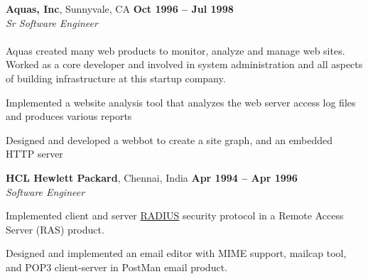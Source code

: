 \documentclass[margin,line]{resume}
\begin{document}
\begin{resume}
    \textbf{Aquas, Inc}, Sunnyvale, CA \hfill \textbf{Oct 1996 -- Jul 1998}\\ 
    \textsl{Sr Software Engineer}\\\\ 
Aquas created many web products to monitor, analyze and manage web sites. Worked as a core developer and involved in system administration and all aspects of building infrastructure at this startup company.
    \begin{list2}
    \item Implemented a website analysis tool that analyzes the web server access log files and produces various reports
    \item Designed and developed a webbot to create a site graph, and an embedded HTTP server
    \end{list2}\vspace{-1.5mm}


    \textbf{HCL Hewlett Packard}, Chennai, India \hfill \textbf{Apr 1994 -- Apr 1996}\\
    \textsl{Software Engineer}\\
    \begin{list2}
    \item Implemented client and server \href{http://www.ietf.org/rfc/rfc2865.txt}{RADIUS} security protocol in a Remote Access Server (RAS) product.
    \item Designed and implemented an email editor with MIME support, mailcap tool, and POP3 client-server in PostMan email product.
    \end{list2}\vspace{-1.5mm}

\end{resume}
\end{document}
